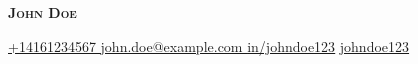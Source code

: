 
\begin{center}
    \textbf{\Large \scshape John Doe } \\ \vspace{1pt}

    \href{tel:+14161234567}{
    \underline{ +14161234567 }} \quad
    \href{mailto:john.doe@example.com}{ \underline{ john.doe@example.com }} \quad
    \href{https://www.linkedin.com/in/johndoe123}{ \underline{in/johndoe123}} \quad
    \href{https://github.com/johndoe123}{ \underline{ johndoe123 }}

\end{center}
    